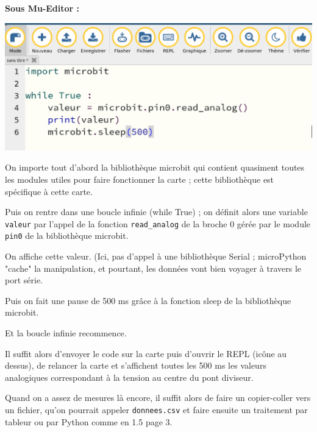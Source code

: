 \documentclass[11pt]{article}
\begin{document}
 
 \begin{multicols}{2}
\begin{center}
  \textbf{Sous Mu-Editor :}                                 \end{center}
  
  
  \includegraphics[scale = 0.25]{mu.EPS}
  
  
  
  On importe tout d'abord la bibliothèque microbit qui contient quasiment toutes les modules utiles pour faire fonctionner la carte ; cette bibliothèque est spécifique à cette carte.
  
  
  Puis on rentre dans une boucle infinie (while True) ; on définit alors une variable \texttt{valeur} par l'appel de la fonction \texttt{read\_analog} de la broche 0 gérée par le module \texttt{pin0} de la bibliothèque microbit.
  
  On affiche cette valeur. (Ici, pas d'appel à une bibliothèque Serial ; microPython "cache" la manipulation, et pourtant, les données vont bien voyager à travers le port série.
  
  Puis on fait une pause de 500 ms grâce à la fonction sleep de la bibliothèque microbit.
  
  Et la boucle infinie recommence.
  
  
  \medskip
  Il suffit alors d'envoyer le code sur la carte puis d'ouvrir le REPL (icône au dessus), de relancer la carte et s'affichent toutes les 500 ms les valeurs analogiques correspondant à la tension au centre du pont diviseur.
  
 \end{multicols}

 
 
 
 Quand on a assez de mesures là encore, il suffit alors de faire un copier-coller vers un fichier, qu'on pourrait appeler \texttt{donnees.csv} et faire ensuite un traitement par tableur ou par Python comme en 1.5 page 3.
 
 
 \medskip
 
\end{document}
